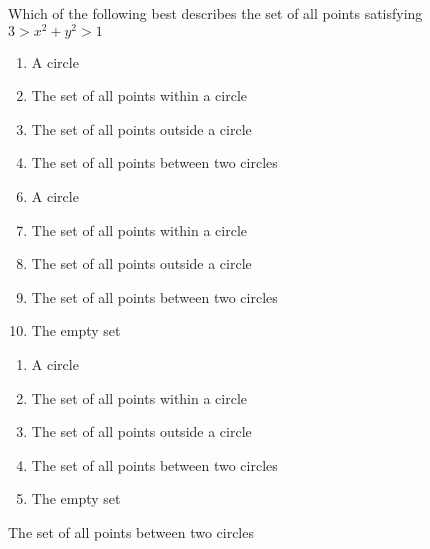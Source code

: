 

 Which of the following best describes the set of all points satisfying $3>x^{2}+y^{2}>1$


\ifsat
	\begin{enumerate}[label=\Alph*)]
		\item   A circle
		\item  The set of all points within a circle
		\item  The set of all points outside a circle 
		\item  The set of all points between two circles%
	\end{enumerate}
\else
\fi

\ifacteven
	\begin{enumerate}[label=\textbf{\Alph*.},itemsep=\fill,align=left]
		\setcounter{enumii}{5}
		\item   A circle
		\item  The set of all points within a circle
		\item  The set of all points outside a circle 
		\addtocounter{enumii}{1}
		\item  The set of all points between two circles%
		\item  The empty set
	\end{enumerate}
\else
\fi

\ifactodd
	\begin{enumerate}[label=\textbf{\Alph*.},itemsep=\fill,align=left]
		\item   A circle
		\item  The set of all points within a circle
		\item  The set of all points outside a circle 
		\item  The set of all points between two circles%
		\item  The empty set
	\end{enumerate}
\else
\fi

\ifgridin
  The set of all points between two circles%

\else
\fi

